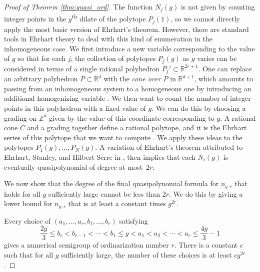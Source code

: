 \documentclass[12pt]{amsart}
\newcommand{\Z}{{\mathbb Z}}
\newcommand{\R}{{\mathbb R}}
\theoremstyle{plain}\newtheorem{proposition}{Proposition}[section]
\begin{document}
\begin{proof}[Proof of Theorem \ref{thm:quasi_ord}]
The function $N_j(g)$ is not given by counting integer points in the $g$\textsuperscript{th} dilate of the polytope $P_j(1)$, so we cannot directly apply the most basic version of Ehrhart's theorem.  However, there are standard tools in Ehrhart theory to deal with this kind of enumeration in the inhomogeneous case.  We first introduce a new variable corresponding to the value of $g$ so that for each $j$, the collection of polytopes $P_j(g)$ as $g$ varies can be considered in terms of a single rational polyhedron $P_j' \subset \R^{2r+1}$.  One can replace an arbitrary polyhedron $P \subset \R^d$ with the \emph{cone over $P$} in $\R^{d+1}$, which amounts to passing from an inhomogeneous system to a homogeneous one by introducing an additional homogenizing variable \cite[Section 4]{normaliz}.  We then want to count the number of integer points in this polyhedron with a fixed value of $g$.  We can do this by choosing a grading on $\Z^d$ given by the value of this coordinate corresponding to $g$.  A rational cone $C$ and a grading together define a rational polytope, and it is the Ehrhart series of this polytope that we want to compute \cite[Section A.6]{Normaliz2}.  We apply these ideas to the polytopes $P_1(g),\ldots, P_N(g)$.  A variation of Ehrhart's theorem attributed to Ehrhart, Stanley, and Hilbert-Serre in \cite[Theorem 15]{normaliz}, then implies that each $N_i(g)$ is eventually quasipolynomial of degree at most~$2r$.

We now show that the degree of the final quasipolynomial formula for $n_{g,r}$ that holds for all $g$ sufficiently large cannot be less than $2r$.  We do this by giving a lower bound for $n_{g,r}$ that is at least a constant times $g^{2r}$.  

Every choice of $(a_1,\ldots, a_r, b_1,\ldots, b_r)$ satisfying 
\[
\frac{2g}{3} \le b_r< b_{r-1}<\cdots < b_1 \le g <  a_1 < a_2 < \cdots < a_r \le \frac{4g}{3}-1
\] 
gives a numerical semigroup of ordinarization number $r$.  There is a constant $c$ such that for all $g$ sufficiently large, the number of these choices is at least $c g^{2r}$.
\end{proof}
\end{document}
